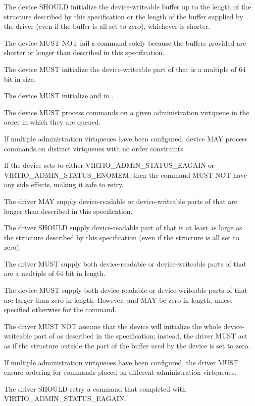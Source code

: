 The device SHOULD initialize the device-writeable buffer
up to the length of the structure described by this specification or
the length of the buffer supplied by the driver (even if the buffer is
all set to zero), whichever is shorter.

The device MUST NOT fail a command solely because the buffers
provided are shorter or longer than described in this
specification.

The device MUST initialize the device-writeable part of
 that is a multiple of 64 bit in
size.

The device MUST initialize  and
 in .

The device MUST process commands on a given administration virtqueue
in the order in which they are queued.

If multiple administration virtqueues have been configured,
device MAY process commands on distinct virtqueues with
no order constraints.

If the device sets  to either VIRTIO_ADMIN_STATUS_EAGAIN
or VIRTIO_ADMIN_STATUS_ENOMEM, then the command MUST NOT
have any side effects, making it safe to retry.


The driver MAY supply device-readable or device-writeable parts
of  that are longer than described in
this specification.

The driver SHOULD supply device-readable part of
 that is at least as
large as the structure described by this specification
(even if the structure is all set to zero).

The driver MUST supply both device-readable or device-writeable parts
of  that are a multiple of 64 bit
in length.

The device MUST supply both device-readable or device-writeable parts
of  that are larger than zero in
length. However,  and
 MAY be zero in length, unless
specified otherwise for the command.

The driver MUST NOT assume that the device will initialize the whole
device-writeable part of  as described in the specification; instead,
the driver MUST act as if the structure
outside the part of the buffer used by the device
is set to zero.

If multiple administration virtqueues have been configured,
the driver MUST ensure ordering for commands
placed on different administration virtqueues.

The driver SHOULD retry a command that completed with
 VIRTIO_ADMIN_STATUS_EAGAIN.
